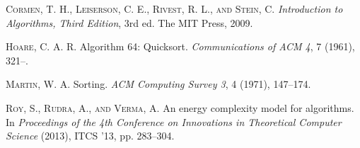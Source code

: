 \documentclass[a4paper, 10pt,twocolumn]{article}
\begin{document}
\begin{thebibliography}{25}
\textsc{Cormen, T. H., Leiserson, C. E., Rivest, R. L., and Stein, C.} \textit{Introduction to Algorithms, Third Edition}, 3rd ed. The MIT Press, 2009.

\textsc{Hoare, C. A. R.} Algorithm 64: Quicksort. \textit{Communications of ACM 4}, 7 (1961), 321--.

\textsc{Martin, W. A.} Sorting. \textit{ACM Computing Survey 3}, 4 (1971), 147--174.

\textsc{Roy, S., Rudra, A., and Verma, A.} An energy complexity model for algorithms. In \textit{Proceedings of the 4th Conference on Innovations in Theoretical Computer Science} (2013), ITCS '13, pp. 283--304.

\end{thebibliography}
\end{document}
